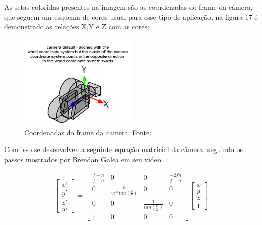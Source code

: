 As setas coloridas presentes na imagem são as coordenadas do frame da câmera, que seguem um esquema de cores usual para esse tipo de aplicação, na figura 17 é demonstrado as relações X,Y e Z com as cores:

\begin{figure}[H]
    \centering
    \includegraphics[width=0.5\textwidth]{images/coordenadas.png}
    \caption{Coordenadas do frame da camera. Fonte: ~\cite[]{the_free_dictionary}}
    \label{fig:coordenadas}
\end{figure}


Com isso se desenvolveu a seguinte equação matricial da câmera, seguindo os passos mostrados por Brendan Galea em seu video ~\cite[]{Galea}:

\begin{equation}
    \begin{bmatrix}
        x' \\
        y' \\
        z' \\
        w
    \end{bmatrix}
    =
    \begin{bmatrix}
        \frac{f+n}{f-n} & 0                                 & 0                               & \frac{-2fn}{f-n} \\
        0               & \frac{h}{w*tan(\frac{\theta}{2})} & 0                               & 0                \\
        0               & 0                                 & \frac{1}{tan(\frac{\theta}{2})} & 0                \\
        1               & 0                                 & 0                               & 0
    \end{bmatrix}
    \begin{bmatrix}
        x \\
        y \\
        z \\
        1
    \end{bmatrix}
\end{equation}

